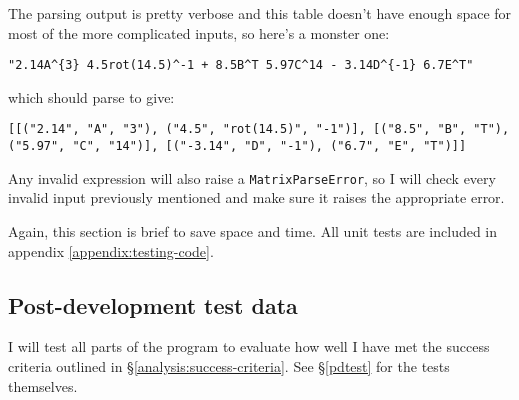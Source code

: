 \documentclass[../main.tex]{subfiles}
\begin{document}
The parsing output is pretty verbose and this table doesn't have enough space for most of the more complicated inputs, so here's a monster one:
\begin{center}
\texttt{"2.14A\textasciicircum\{3\} 4.5rot(14.5)\textasciicircum-1 + 8.5B\textasciicircum T 5.97C\textasciicircum14 - 3.14D\textasciicircum\{-1\} 6.7E\textasciicircum T"}
\end{center}
which should parse to give:
\begin{center}
\texttt{[[("2.14", "A", "3"), ("4.5", "rot(14.5)", "-1")], [("8.5", "B", "T"), ("5.97", "C", "14")], [("-3.14", "D", "-1"), ("6.7", "E", "T")]]}
\end{center}

Any invalid expression will also raise a \texttt{MatrixParseError}, so I will check every invalid input previously mentioned and make sure it raises the appropriate error.

Again, this section is brief to save space and time. All unit tests are included in appendix \ref{appendix:testing-code}.

\subsection{Post-development test data\label{design:post-development-test-data}}

I will test all parts of the program to evaluate how well I have met the success criteria outlined in \S\ref{analysis:success-criteria}. See \S\ref{pdtest} for the tests themselves.
\end{document}
